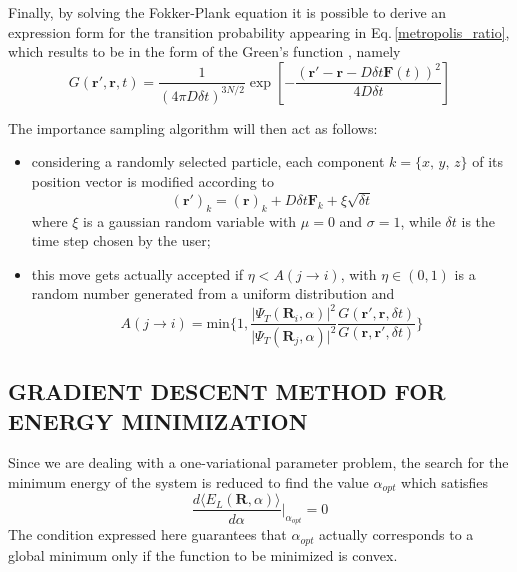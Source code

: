 Finally, by solving the Fokker-Plank equation it is possible to derive an expression form for the transition probability appearing in Eq.\,\ref{metropolis_ratio}, which results to be in the form of the Green's function \cite{lectures2015}, namely
\begin{equation*}
    G(\bm{r}', \bm{r}, t) = \frac{1}{\left (4 \pi D \delta t\right)^{3N/2}} \exp \left[ - \frac{ \left( \bm{r}' - \bm{r} - D\delta t \bm{F}(t)\right)^2}{4D\delta t}  \right]
\end{equation*}

The importance sampling algorithm will then act as follows:
\begin{itemize}
    \item considering a randomly selected particle, each  component $k = \{x,\,y,\,z\}$ of its position vector is modified according to
    \begin{equation*}
        (\bm{r}')_k = (\bm{r})_k + D \delta t \bm{F}_k + \xi \sqrt{\delta t}
    \end{equation*}
    where $\xi$ is a gaussian random variable with $\mu = 0$ and $\sigma=1$, while $\delta t$ is the time step chosen by the user;
    \item this move gets actually accepted if $\eta < A(j\rightarrow i)$, with $\eta \in (0,1)$ is a random number generated from a uniform distribution and
    \begin{equation}
        A(j \rightarrow i) = \text{min} \bigg\{ 1, \frac{\vert \Psi_T(\bm{R}_i, \alpha)\vert^2}{\vert \Psi_T(\bm{R}_j, \alpha)\vert^2} \frac{G(\bm{r}', \bm{r}, \delta t)}{G(\bm{r}, \bm{r}', \delta t)} \bigg\}
        \label{acceptance_importance}
    \end{equation}
\end{itemize}



\subsection{GRADIENT DESCENT METHOD FOR ENERGY MINIMIZATION}
Since we are dealing with a one-variational parameter problem, the search for the minimum energy of the system is reduced to find the value $\alpha_{opt}$ which satisfies
\begin{equation}
    \frac{d \langle E_L(\bm{R},\alpha) \rangle}{d \alpha} \bigg\vert_{\alpha_{opt}} = 0
    \label{null_derivative}
\end{equation}
The condition expressed here guarantees that $\alpha_{opt}$ actually corresponds to a global minimum only if the function to be minimized is convex.

